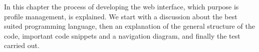 In this chapter the process of developing the web interface, which purpose is profile management, is explained. We start with a discussion about the best suited programming language, then an explanation of the general structure of the code, important code snippets and a navigation diagram, and finally the test carried out.